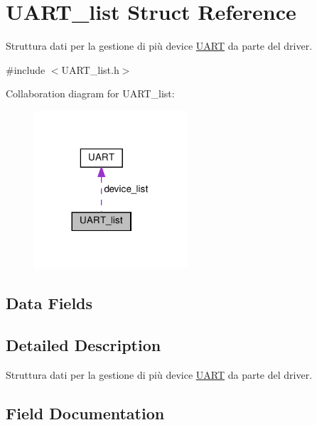 \hypertarget{structUART__list}{}\section{U\+A\+R\+T\+\_\+list Struct Reference}
\label{structUART__list}


Struttura dati per la gestione di più device \hyperlink{structUART}{U\+A\+RT} da parte del driver.  




{\ttfamily \#include $<$U\+A\+R\+T\+\_\+list.\+h$>$}



Collaboration diagram for U\+A\+R\+T\+\_\+list\+:
\nopagebreak
\begin{figure}[H]
\begin{center}
\leavevmode
\includegraphics[width=161pt]{structUART__list__coll__graph}
\end{center}
\end{figure}
\subsection*{Data Fields}


\subsection{Detailed Description}
Struttura dati per la gestione di più device \hyperlink{structUART}{U\+A\+RT} da parte del driver. 

\subsection{Field Documentation}
\mbox{\label{structUART__list_a170d1d78f27f6ab4c8badaaa4b3f2305}} 
